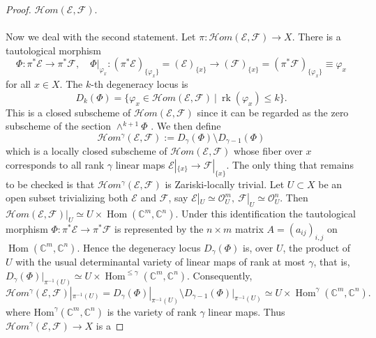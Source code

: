 \documentclass{amsart}
\theoremstyle{plain}
\numberwithin{equation}{section}
\theoremstyle{definition}
\theoremstyle{remark}
\begin{document}
\begin{proof}
		$\mathcal H om(\mathcal E,\mathcal F)$.
		\\
		\\
		Now we deal with the second statement. Let $\pi:\mathcal{H}om(\mathcal{E},\mathcal{F})\to X$. There is a tautological morphism 
		\begin{equation}\label{tautologicalHomBetweenTwoVB}
			\Phi:\pi^*\mathcal{E}\to \pi^*\mathcal{F},\quad\Phi|_{\varphi_x}:(\pi^*\mathcal{E})_{\{\varphi_x\}}=(\mathcal{E})_{\{x\}}\to (\mathcal{F})_{\{x\}}=(\pi^*\mathcal{F})_{\{\varphi_x\}}\equiv \varphi_x
		\end{equation}
		for all $x\in X$. The $k$-th degeneracy locus is 
		\begin{equation}\label{DegeneracyLocus}
			D_k(\Phi)=\{\varphi_x\in \mathcal{H}om(\mathcal{E},\mathcal{F})\ | \ \operatorname{rk}(\varphi_x)\leq k\}.
		\end{equation}
		This is a closed subscheme of $\mathcal{H}om(\mathcal{E},\mathcal{F})$ since it can be regarded as the zero subscheme of the section $\wedge^{k+1}\Phi$ \cite[Chapter 14]{FultonIntersectionTheory}. We then define
		$$
		\mathcal{H}om^\gamma(\mathcal{E},\mathcal{F}):= D_{\gamma}(\Phi)\setminus D_{\gamma-1}(\Phi)
		$$
		which is a locally closed subscheme of $\mathcal{H}om(\mathcal{E},\mathcal{F})$ whose fiber over $x$ corresponds to all rank $\gamma$ linear maps $\mathcal{E}|_{\{x\}}\to \mathcal{F}|_{\{x\}}$. The only thing that remains to be checked is that $\mathcal{H}om^\gamma(\mathcal{E},\mathcal{F})$ is Zariski-locally trivial. Let \(U\subset X\) be an open subset trivializing both \(\mathcal E\) and
		\(\mathcal F\), say $\mathcal E|_U\simeq \mathcal O_U^m,\ \mathcal F|_U\simeq \mathcal O_U^n$.
		Then
		$ \mathcal H om(\mathcal E,\mathcal F)|_U \simeq U\times \operatorname{Hom}(\mathbb C^m,\mathbb C^n)$. Under this identification the tautological morphism $\Phi:\pi^*\mathcal E\to \pi^*\mathcal F$
		is represented by the $n\times m$ matrix $A=(a_{ij})_{i,j}$ on
		\(\operatorname{Hom}(\mathbb C^m,\mathbb C^n)\). Hence the degeneracy locus
		\(D_\gamma(\Phi)\) is, over \(U\), the product of \(U\) with the usual
		determinantal variety of linear maps of rank at most $\gamma$, that is, 
		$
		D_\gamma(\Phi)|_{\pi^{-1}(U)}
		\simeq
		U\times \operatorname{Hom}^{\le \gamma}(\mathbb C^m,\mathbb C^n).
		$
		Consequently,
		$$
		\mathcal H om^\gamma(\mathcal E,\mathcal F)|_{\pi^{-1}(U)}
		=
		D_\gamma(\Phi)|_{\pi^{-1}(U)}
		\setminus
		D_{\gamma-1}(\Phi)|_{\pi^{-1}(U)}
		\simeq
		U\times \operatorname{Hom}^{\gamma}(\mathbb C^m,\mathbb C^n).
		$$
		where $\text{Hom}^\gamma(\mathbb{C}^m,\mathbb{C}^n)$ is the variety of rank $\gamma$ linear maps. Thus \(\mathcal H om^\gamma(\mathcal E,\mathcal F)\to X\) is a

\end{proof}
\end{document}

